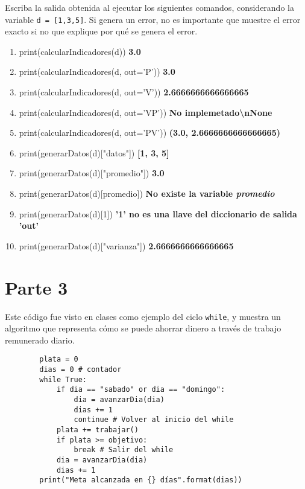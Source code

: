 \documentclass{article}
\newcommand{\code}[1]{\texttt{#1}}
\begin{document}
Escriba la salida obtenida al ejecutar los siguientes comandos, considerando la variable \code{d = [1,3,5]}. Si genera un error, no es importante que muestre el error exacto si no que explique por qué se genera el error. 
    \begin{enumerate}
        \item print(calcularIndicadores(d))
        \hfill\textbf{3.0 }
        \item print(calcularIndicadores(d, out='P'))
        \hfill\textbf{3.0 }
        \item print(calcularIndicadores(d, out='V'))
        \hfill\textbf{2.6666666666666665 }
        \item print(calcularIndicadores(d, out='VP'))
        \hfill\textbf{No implemetado\textbackslash nNone }
        \item print(calcularIndicadores(d, out='PV'))
        \hfill\textbf{ (3.0, 2.6666666666666665) }
        \item print(generarDatos(d)["datos"])
        \hfill\textbf{[1, 3, 5] }
        \item print(generarDatos(d)["promedio"])
        \hfill\textbf{ 3.0 }
        \item print(generarDatos(d)[promedio])
        \hfill\textbf{No existe la variable \emph{promedio}}
        \item print(generarDatos(d)[1])
        \hfill\textbf{'1' no es una llave del diccionario de salida 'out'}
        \item print(generarDatos(d)["varianza"])
        \hfill\textbf{ 2.6666666666666665 }
    \end{enumerate}

\newpage
\section*{Parte 3}
Este código fue visto en clases como ejemplo del ciclo \code{while}, y muestra un algoritmo que representa cómo se puede ahorrar dinero a través de trabajo remunerado diario.

    \begin{small}
    \begin{verbatim}
        plata = 0
        dias = 0 # contador
        while True:
            if dia == "sabado" or dia == "domingo":
                dia = avanzarDia(dia)
                dias += 1
                continue # Volver al inicio del while
            plata += trabajar()
            if plata >= objetivo:
                break # Salir del while
            dia = avanzarDia(dia)
            dias += 1
        print("Meta alcanzada en {} días".format(dias))
    \end{verbatim}
    \end{small}
\end{document}
